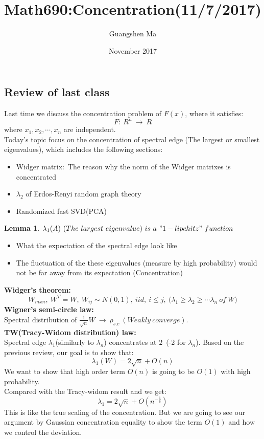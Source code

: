 \documentclass{article}
\title{Math690:Concentration(11/7/2017)}
\author{Guangshen Ma}
\date{November 2017}
\newtheorem{lemma}[theorem]{Lemma}
\begin{document}
\maketitle

\subsection{Review of last class}
Last time we discuss the concentration problem of $F(x)$, where it satisfies:
\[
F:~R^n~\rightarrow~R 
\]
where $x_1,x_2,{\cdots},x_n$ are independent.
\\
Today's topic focus on the concentration of spectral edge (The largest or smallest eigenvalues), which includes the following sections:
\begin{itemize}
    \item Widger matrix:~The reason why the norm of the Widger matrixes is concentrated 
    \item $\lambda_2$ of Erdos-Renyi random graph theory
    \item Randomized fast SVD(PCA)
\end{itemize}
\begin{lemma}
 $\lambda_1(A)~(The~largest    ~eigenvalue)~is~a~"1-lipchitz"~function$
\end{lemma}
\begin{itemize}
\item What the expectation of the spectral edge look like
\item The fluctuation of the these eigenvalues (measure by high probability) would not be far away from its expectation (Concentration)
\end{itemize}
\noindent
\textbf{Widger's theorem:} 
\[
W_{mxn},~W^T = W,~W_{ij}{\sim}N(0,1),~iid,~i{\leq}j,~(\lambda_1{\geq\lambda_2\geq{\cdots}\lambda_n~of~W)}
\] 
\noindent
\textbf{Wigner's semi-circle law:}\\
\noindent
Spectral distribution of $\frac{1}{\sqrt{n}}W~{\rightarrow}~\rho_{s.c}~(Weakly~converge)$.\\

\noindent
\textbf{TW(Tracy-Widom distribution) law:}\\
Spectral edge $\lambda_1$(similarly to $\lambda_n$) concentrates at $2$~(-2 for $\lambda_n$).
\noindent
Based on the previous review, our goal is to show that:
\[
\lambda_1(W) = 2\sqrt{n}+O(n)
\]
We want to show that high order term $O(n)$ is going to be $O(1)$ with high probability.
\\
\noindent 
Compared with the Tracy-widom result and we get:
\[
\lambda_1 = 2\sqrt{n} + O(n^{-\frac{1}{6}})
\]
This is like the true scaling of the concentration. But we are going to see our argument by Gaussian concentration equality to show the term $O(1)$ and how we control the deviation.
\end{document}
